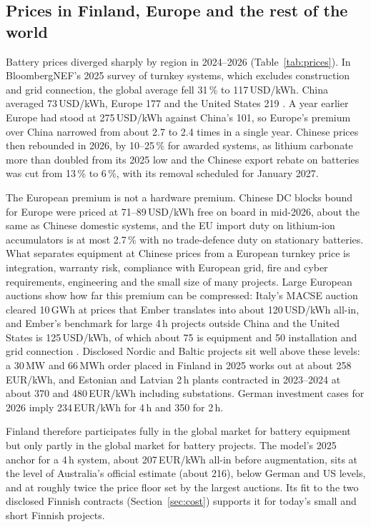 \documentclass[11pt]{article}
\newcommand{\EUR}{EUR}
\begin{document}
\subsection{Prices in Finland, Europe and the rest of the world}\label{sec:prices}
Battery prices diverged sharply by region in 2024--2026 (Table~\ref{tab:prices}).
In BloombergNEF's 2025 survey of turnkey systems, which excludes construction and grid connection, the global average fell 31\,\% to 117\,USD/kWh. China averaged 73\,USD/kWh, Europe 177 and the United States 219 \citep{bnef2025ess}.
A year earlier Europe had stood at 275\,USD/kWh against China's 101, so Europe's premium over China narrowed from about 2.7 to 2.4 times in a single year.
Chinese prices then rebounded in 2026, by 10--25\,\% for awarded systems, as lithium carbonate more than doubled from its 2025 low and the Chinese export rebate on batteries was cut from 13\,\% to 6\,\%, with its removal scheduled for January 2027.

The European premium is not a hardware premium.
Chinese DC blocks bound for Europe were priced at 71--89\,USD/kWh free on board in mid-2026, about the same as Chinese domestic systems, and the EU import duty on lithium-ion accumulators is at most 2.7\,\% with no trade-defence duty on stationary batteries.
What separates equipment at Chinese prices from a European turnkey price is integration, warranty risk, compliance with European grid, fire and cyber requirements, engineering and the small size of many projects.
Large European auctions show how far this premium can be compressed: Italy's MACSE auction cleared 10\,GWh at prices that Ember translates into about 120\,USD/kWh all-in, and Ember's benchmark for large 4\,h projects outside China and the United States is 125\,USD/kWh, of which about 75 is equipment and 50 installation and grid connection \citep{ember2025cheap}.
Disclosed Nordic and Baltic projects sit well above these levels: a 30\,MW and 66\,MWh order placed in Finland in 2025 works out at about 258\,\EUR/kWh, and Estonian and Latvian 2\,h plants contracted in 2023--2024 at about 370 and 480\,\EUR/kWh including substations. German investment cases for 2026 imply 234\,\EUR/kWh for 4\,h and 350 for 2\,h.

Finland therefore participates fully in the global market for battery equipment but only partly in the global market for battery projects.
The model's 2025 anchor for a 4\,h system, about 207\,\EUR/kWh all-in before augmentation, sits at the level of Australia's official estimate (about 216), below German and US levels, and at roughly twice the price floor set by the largest auctions. Its fit to the two disclosed Finnish contracts (Section~\ref{sec:cost}) supports it for today's small and short Finnish projects.
\end{document}
